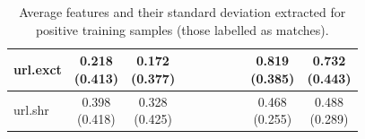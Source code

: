 \documentclass[epsfig,a4paper,11pt,titlepage,twoside,openany]{book}
\begin{document}
\begin{table}[H]
\begin{tabular}{l|c|c|c|c|c|c|c|c|c|}
\multicolumn{1}{|l|}{url.exct}                           & \makecell{0.218 \\ (0.413)}  & \makecell{0.172 \\ (0.377)} &              &              &              &              &              & \makecell{0.819 \\ (0.385)}    & \makecell{0.732 \\ (0.443)}   \\ \hline
\multicolumn{1}{|l|}{url.shr}                  & \makecell{0.398 \\ (0.418)}  & \makecell{0.328 \\ (0.425)} &              &              &              &              &              & \makecell{0.468 \\ (0.255)}    & \makecell{0.488 \\ (0.289)}   \\ \hline
\end{tabular}
\caption{Average features and their standard deviation extracted for positive training samples (those labelled as matches).}
\label{tab:features-viz-average-std-positive}
\end{table}
\end{document}
